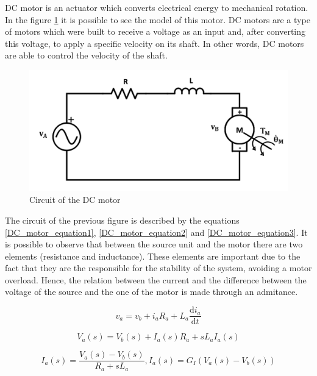 DC motor is an actuator which converts electrical energy to mechanical rotation. In the figure \ref{dcmotor_circuit} it is possible to see the model of this motor. DC motors are a type of motors which were built to receive a voltage as an input and, after converting this voltage, to apply a specific velocity on its shaft. In other words, DC motors are able to control the velocity of the shaft.

\begin{figure}[H]
\centering
\includegraphics[scale=0.5]{figures/dcmotor_circuit.png}
\caption{Circuit of the DC motor}
\label{dcmotor_circuit}
\end{figure}

The circuit of the previous figure is described by the equations \ref{DC_motor_equation1}, \ref{DC_motor_equation2} and \ref{DC_motor_equation3}. It is possible to observe that between the source unit and the motor there are two elements (resistance and inductance). These elements are important due to the fact that they are the responsible for the stability of the system, avoiding a motor overload. Hence, the relation between the current and the difference between the voltage of the source and the one of the motor is made through an admitance.

\begin{equation}\label{DC_motor_equation1}
v_{a}= v_{b}+i_{a} R_{a}+L_{a}\frac{\mathrm{d} i_{a}}{\mathrm{d} t}
\end{equation}

\begin{equation}\label{DC_motor_equation2}
V_{a}(s)= V_{b}(s)+I_{a}(s) R_{a}+sL_{a}I_{a}(s)
\end{equation}

\begin{equation}\label{DC_motor_equation3}
I_{a}(s)= \frac{V_{a}(s)-V_{b}(s)}{R_{a}+sL_{a}} , I_{a}(s)= G_{I}(V_{a}(s)-V_{b}(s))
\end{equation}

